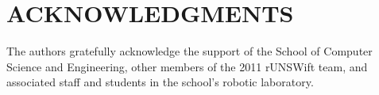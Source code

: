 \documentclass[runningheads,a4paper]{llncs}
\begin{document}

\section{ACKNOWLEDGMENTS}

The authors gratefully acknowledge the support of the School of Computer Science and Engineering, other members of the 2011 rUNSWift team, and associated staff and students in the school's robotic laboratory.

%




%
\end{document}
